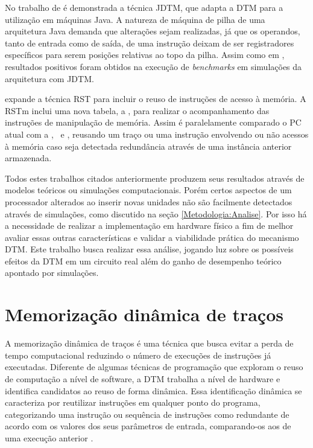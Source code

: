 No trabalho de  é demonstrada a técnica JDTM, que adapta a DTM para a utilização em máquinas Java. A natureza de máquina de pilha de uma arquitetura Java demanda que alterações sejam realizadas, já que os operandos, tanto de entrada como de saída, de uma instrução deixam de ser registradores específicos para serem posições relativas ao topo da pilha. Assim como em , resultados positivos foram obtidos na execução de \textit{benchmarks} em simulações da arquitetura com JDTM.

 expande a técnica RST para incluir o reuso de instruções de acesso à memória. A RSTm inclui uma nova tabela, a \tablel, para realizar o acompanhamento das instruções de manipulação de memória. Assim é paralelamente comparado o PC atual com a \tableg, \tablet\ e \tablel, reusando um traço ou uma instrução envolvendo ou não acessos à memória caso seja detectada redundância através de uma instância anterior armazenada.


Todos estes trabalhos citados anteriormente produzem seus resultados através de modelos teóricos ou simulações computacionais. Porém certos aspectos de um processador alterados ao inserir novas unidades não são facilmente detectados através de simulações, como discutido na seção \ref{Metodologia:Analise}. Por isso há a necessidade de realizar a implementação em hardware físico a fim de melhor avaliar essas outras características e validar a viabilidade prática do mecanismo DTM. Este trabalho busca realizar essa análise, jogando luz sobre os possíveis efeitos da DTM em um circuito real além do ganho de desempenho teórico apontado por simulações.

\section{Memorização dinâmica de traços}
\label{Fundamentacao:DTM}

A memorização dinâmica de traços é uma técnica que busca evitar a perda de tempo computacional reduzindo o número de execuções de instruções já executadas. Diferente de algumas técnicas de programação que exploram o reuso de computação a nível de software, a DTM trabalha a nível de hardware e identifica candidatos ao reuso de forma dinâmica. Essa identificação dinâmica se caracteriza por reutilizar instruções em qualquer ponto do programa, categorizando uma instrução ou sequência de instruções como redundante de acordo com os valores dos seus parâmetros de entrada, comparando-os aos de uma execução anterior \cite{costa2001explorando}.


